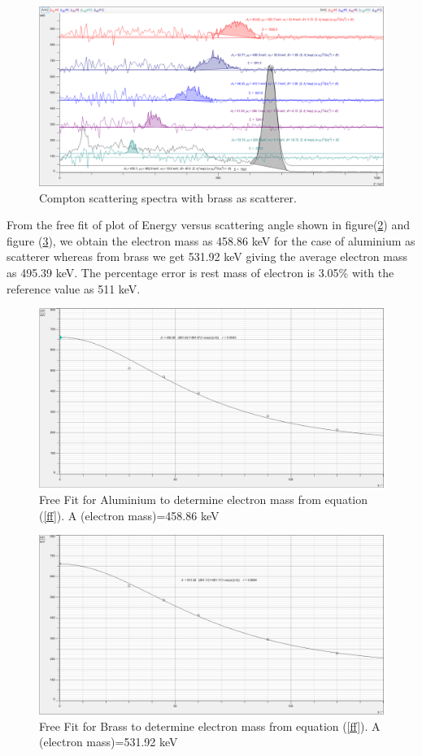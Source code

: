 \documentclass[a4paper, amsfonts, amssymb, amsmath, reprint, showkeys, nofootinbib, twoside]{revtex4-1}
\begin{document}
\begin{figure}[H]
	\centering
	\includegraphics[width=\columnwidth]{br spectra} 
	\caption{Compton scattering spectra with brass as scatterer.}
	\label{bs}
\end{figure}

From the free fit of plot of Energy versus scattering angle shown in figure(\ref{aem}) and figure (\ref{bem}), we obtain the electron mass as 458.86 keV for the case of aluminium as scatterer whereas from brass we get 531.92 keV giving the average electron mass as 495.39 keV. The percentage error is rest mass of electron is 3.05\% with the reference value as 511 keV. 

\begin{figure}[H]
	\centering
	\includegraphics[width=\columnwidth]{al fit} 
	\caption{Free Fit for Aluminium to determine electron mass from equation (\ref{ff}). A (electron mass)=458.86 keV}
	\label{aem}
\end{figure}

\begin{figure}[H]
	\centering
	\includegraphics[width=\columnwidth]{br fit} 
	\caption{Free Fit for Brass to determine electron mass from equation (\ref{ff}). A (electron mass)=531.92 keV}
	\label{bem}
\end{figure}
\end{document}
